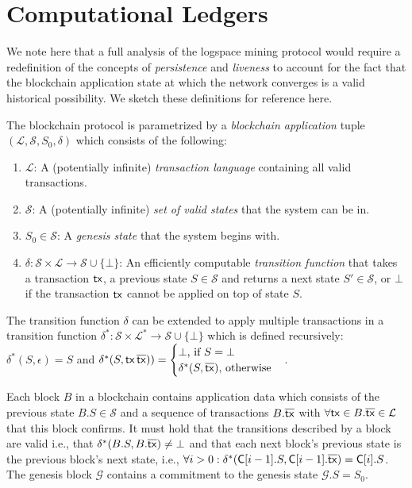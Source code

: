 \section{Computational Ledgers}

We note here that a full analysis of the logspace mining protocol would require
a redefinition of the concepts of \emph{persistence} and \emph{liveness} to account
for the fact that the blockchain application state at which the network converges
is a valid historical possibility. We sketch these definitions for reference here.

The blockchain protocol is parametrized by a \emph{blockchain application}
tuple $(\mathcal{L}, \mathcal{S}, S_0, \delta)$ which consists of the following:

\begin{enumerate}
  \item $\mathcal{L}$: A (potentially infinite) \emph{transaction language} containing all valid
  transactions.
  \item $\mathcal{S}$: A (potentially infinite) \emph{set of valid states} that the system can be in.
  \item $S_0 \in \mathcal{S}$: A \emph{genesis state} that the system begins
  with.
  \item $\delta: \mathcal{S} \times \mathcal{L} \longrightarrow \mathcal{S} \cup \{\bot\}$:
  An efficiently computable \emph{transition function} that takes a transaction
  $\mathsf{tx}$, a previous state $S \in \mathcal{S}$ and returns a next state
  $S' \in \mathcal{S}$, or $\bot$ if the transaction $\mathsf{tx}$ cannot be applied on
  top of state $S$.
\end{enumerate}

The transition function $\delta$ can be extended to apply multiple transactions
in a transition function
$\delta^*: \mathcal{S} \times \mathcal{L}^* \longrightarrow \mathcal{S} \cup \{\bot\}$
which is defined recursively: $\delta^*(S, \epsilon) = S$ and
$\delta^*(S, \mathsf{tx}\,\overline{\mathsf{tx}})) = \begin{cases}
  \bot\text{, if } S = \bot\\
  \delta^*(S, \overline{\mathsf{tx}})\text{, otherwise}\end{cases}$.

Each block $B$ in a blockchain contains application data which consists of the
previous state $B.S \in \mathcal{S}$ and a sequence of transactions
$B.\overline{\mathsf{tx}}$ with $\forall \mathsf{tx} \in B.\overline{\mathsf{tx}} \in \mathcal{L}$ that this
block confirms. It must hold that the transitions described by a block are
valid i.e., that $\delta^*(B.S, B.\overline{\mathsf{tx}}) \neq \bot$ and that each next
block's previous state is the previous block's next state, i.e.,
$\forall i > 0: \delta^*(\mathsf{C}[i - 1].S, \mathsf{C}[i - 1].\overline{\mathsf{tx}}) = \mathsf{C}[i].S$.
The genesis block $\mathcal{G}$ contains a commitment
to the genesis state $\mathcal{G}.S = S_0$.

